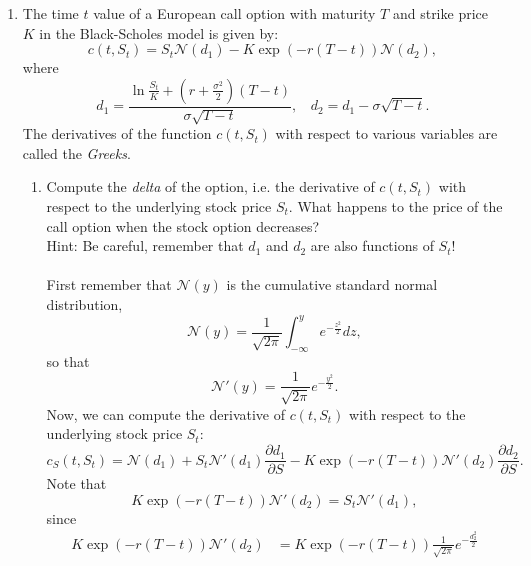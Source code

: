 \documentclass[11pt,a4,table]{article}
\begin{document}
\begin{enumerate}
    
    \item The time $t$ value of a European call option with maturity $T$ and strike price $K$ in the Black-Scholes model is given by:
    \begin{equation}
        c(t,S_t) = S_t \mathcal{N}(d_1) - K \exp(-r(T-t))\mathcal{N}(d_2),
    \end{equation}
    where
    \begin{equation*}
        d_1=\frac{\ln \frac{S_t}{K} + \left(r+\frac{\sigma^2}{2}\right)(T-t)}{\sigma\sqrt{T-t}},~~~~ d_2=d_1 - \sigma \sqrt{T-t}.
    \end{equation*}
    The derivatives of the function $c(t,S_t)$ with respect to various variables are called the \textit{Greeks}.
    \begin{enumerate}
        \item Compute the \textit{delta} of the option, i.e. the derivative of $c(t,S_t)$ with respect to the underlying stock price $S_t$. What happens to the price of the call option when the stock option decreases?\\
        Hint: Be careful, remember that $d_1$ and $d_2$ are also functions of $S_t$!\\\\
        First remember that $\mathcal{N}(y)$ is the cumulative standard normal distribution,
        \begin{equation*}
            \mathcal{N}(y) = \frac{1}{\sqrt{2\pi}}\int_{-\infty}^y e^{-\frac{z^2}{2}} dz,
        \end{equation*}
        so that
        \begin{equation*}
            \mathcal{N}'(y) = \frac{1}{\sqrt{2\pi}} e^{-\frac{y^2}{2}}.
        \end{equation*}
        Now, we can compute the derivative of $c(t,S_t)$ with respect to the underlying stock price $S_t$:
        \begin{equation*}
            c_S(t,S_t) = \mathcal{N}(d_1) + S_t\mathcal{N}'(d_1)\frac{\partial d_1}{\partial S} - K \exp(-r(T-t))\mathcal{N}'(d_2) \frac{\partial d_2}{\partial S}.
        \end{equation*}
        Note that
        \begin{equation*}
            K \exp(-r(T-t))\mathcal{N}'(d_2) = S_t \mathcal{N}'(d_1),
        \end{equation*}
        since
        \begin{align*}
            K \exp(-r(T-t))\mathcal{N}'(d_2) &= K \exp(-r(T-t))\frac{1}{\sqrt{2\pi}} e^{-\frac{d^2_2}{2}}\\

\end{align*}
\end{enumerate}
\end{enumerate}
\end{document}
